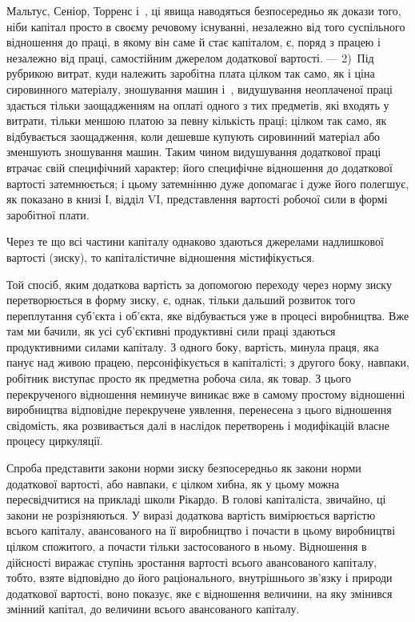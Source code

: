 \parcont{}  %
Мальтус, Сеніор, Торренс і~, ці явища наводяться безпосередньо
як докази того, ніби капітал просто в своєму речовому
існуванні, незалежно від того суспільного відношення до
праці, в якому він саме й стає капіталом, є, поряд з працею
і незалежно від праці, самостійним джерелом додаткової вартості.
— 2)~Під рубрикою витрат, куди належить заробітна плата
цілком так само, як і ціна сировинного матеріалу, зношування
машин і~, видушування неоплаченої праці здається тільки
заощадженням на оплаті одного з тих предметів, які входять
у витрати, тільки меншою платою за певну кількість праці;
цілком так само, як відбувається заощадження, коли дешевше
купують сировинний матеріал або зменшують зношування машин.
Таким чином видушування додаткової праці втрачає свій
специфічний характер; його специфічне відношення до додаткової
вартості затемнюється; і цьому затемнінню дуже допомагає
і дуже його полегшує, як показано в книзі І, відділ VI,
представлення вартості робочої сили в формі заробітної плати.

Через те що всі частини капіталу однаково здаються джерелами
надлишкової вартості (зиску), то капіталістичне відношення
містифікується.

Той спосіб, яким додаткова вартість за допомогою переходу
через норму зиску перетворюється в форму зиску, є, однак,
тільки дальший розвиток того переплутання суб’єкта і об’єкта,
яке відбувається уже в процесі виробництва. Вже там ми бачили,
як усі суб’єктивні продуктивні сили праці здаються продуктивними
силами капіталу. З одного боку, вартість, минула праця,
яка панує над живою працею, персоніфікується в капіталісті;
з другого боку, навпаки, робітник виступає просто як предметна
робоча сила, як товар. З цього перекрученого відношення неминуче
виникає вже в самому простому відношенні виробництва
відповідне перекручене уявлення, перенесена з цього відношення
свідомість, яка розвивається далі в наслідок перетворень і модифікацій
власне процесу циркуляції.

Спроба представити закони норми зиску безпосередньо як закони
норми додаткової вартості, або навпаки, є цілком хибна, як
у цьому можна пересвідчитися на прикладі школи Рікардо. В голові
капіталіста, звичайно, ці закони не розрізняються. У виразі 
додаткова вартість вимірюється вартістю всього капіталу, авансованого
на її виробництво і почасти в цьому виробництві цілком спожитого,
а почасти тільки застосованого в ньому. Відношення  в
дійсності виражає ступінь зростання вартості всього авансованого
капіталу, тобто, взяте відповідно до його раціонального, внутрішнього
зв’язку і природи додаткової вартості, воно показує,
яке є відношення величини, на яку змінився змінний капітал, до
величини всього авансованого капіталу.
